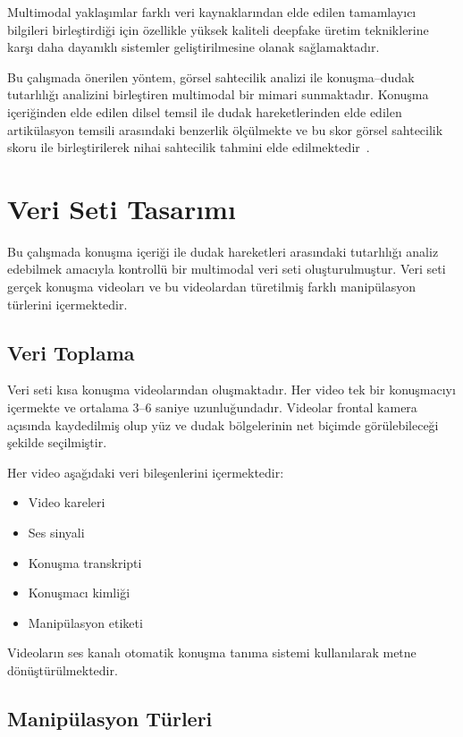 \documentclass[conference]{IEEEtran}
\begin{document}
Multimodal yaklaşımlar farklı veri kaynaklarından elde edilen tamamlayıcı bilgileri birleştirdiği için özellikle yüksek kaliteli deepfake üretim tekniklerine karşı daha dayanıklı sistemler geliştirilmesine olanak sağlamaktadır.

Bu çalışmada önerilen yöntem, görsel sahtecilik analizi ile konuşma--dudak tutarlılığı analizini birleştiren multimodal bir mimari sunmaktadır. Konuşma içeriğinden elde edilen dilsel temsil ile dudak hareketlerinden elde edilen artikülasyon temsili arasındaki benzerlik ölçülmekte ve bu skor görsel sahtecilik skoru ile birleştirilerek nihai sahtecilik tahmini elde edilmektedir~\cite{haldar2024fakeavceleb}.

\section{Veri Seti Tasarımı}

Bu çalışmada konuşma içeriği ile dudak hareketleri arasındaki tutarlılığı analiz edebilmek amacıyla kontrollü bir multimodal veri seti oluşturulmuştur. Veri seti gerçek konuşma videoları ve bu videolardan türetilmiş farklı manipülasyon türlerini içermektedir.

\subsection{Veri Toplama}

Veri seti kısa konuşma videolarından oluşmaktadır. Her video tek bir konuşmacıyı içermekte ve ortalama 3--6 saniye uzunluğundadır. Videolar frontal kamera açısında kaydedilmiş olup yüz ve dudak bölgelerinin net biçimde görülebileceği şekilde seçilmiştir.

Her video aşağıdaki veri bileşenlerini içermektedir:

\begin{itemize}
  \item Video kareleri
  \item Ses sinyali
  \item Konuşma transkripti
  \item Konuşmacı kimliği
  \item Manipülasyon etiketi
\end{itemize}

Videoların ses kanalı otomatik konuşma tanıma sistemi kullanılarak metne dönüştürülmektedir.

\subsection{Manipülasyon Türleri}
\end{document}

